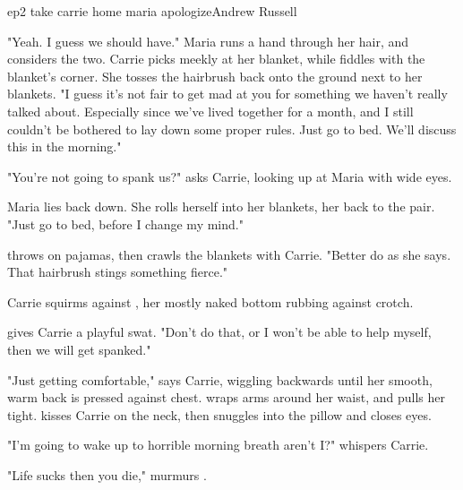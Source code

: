 \documentclass{book}
\begin{document}
\begin{childnode}{ep2 take carrie home maria apologize}{Andrew Russell}

    "Yeah. I guess we should have." Maria runs a hand through her hair, and considers the two. Carrie picks meekly at her blanket, while \name{} fiddles with the blanket's corner. She tosses the hairbrush back onto the ground next to her blankets. "I guess it's not 
    fair to get 
    mad at you for something we haven't really talked about. Especially since we've lived together for a month, and I still couldn't be bothered to lay down some proper rules. Just go to bed. We'll discuss this in the morning."

    "You're not going to spank us?" asks Carrie, looking up at Maria with wide eyes.

    Maria lies back down. She rolls herself into her blankets, her back to the pair. "Just go to bed, before I change my mind."

    \name{} throws on \hisher{} pajamas, then crawls the blankets with Carrie. "Better do as she says. That hairbrush stings something fierce."

    Carrie squirms against \name{}, her mostly naked bottom rubbing against \names{} crotch.  

    \name{} gives Carrie a playful swat. "Don't do that, or I won't be able to help myself, then we will get spanked."

    "Just getting comfortable," says Carrie, wiggling backwards until her smooth, warm back is pressed against \names{} chest. \name{} wraps \hisher{} arms around her waist, and pulls her tight. \name{} kisses Carrie on the neck, then snuggles into the 
    pillow and closes \hisher{} eyes.

    "I'm going to wake up to horrible morning breath aren't I?" whispers Carrie.

    "Life sucks then you die," murmurs \name{}.


\end{childnode}
\end{document}
